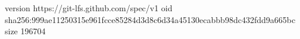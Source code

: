 version https://git-lfs.github.com/spec/v1
oid sha256:999ae11250315e961fcce85284d3d8c6d34a45130ecabbb98dc432fdd9a665bc
size 196704
